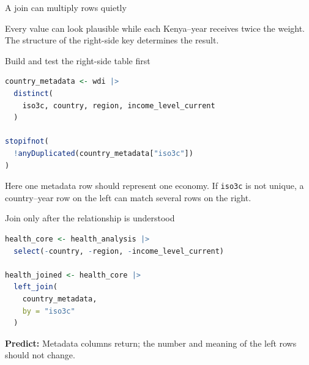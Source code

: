 \begin{frame}{A join can multiply rows quietly}
  \begin{center}
  \end{center}

  \vspace{0.65em}
  Every value can look plausible while each Kenya--year receives twice the
  weight. The structure of the right-side key determines the result.
\end{frame}

\begin{frame}[fragile]{Build and test the right-side table first}
\begin{lstlisting}[language=R]
country_metadata <- wdi |>
  distinct(
    iso3c, country, region, income_level_current
  )

stopifnot(
  !anyDuplicated(country_metadata["iso3c"])
)
\end{lstlisting}

  Here one metadata row should represent one economy. If \texttt{iso3c} is not
  unique, a country--year row on the left can match several rows on the right.
\end{frame}

\begin{frame}[fragile]{Join only after the relationship is understood}
\begin{lstlisting}[language=R]
health_core <- health_analysis |>
  select(-country, -region, -income_level_current)

health_joined <- health_core |>
  left_join(
    country_metadata,
    by = "iso3c"
  )
\end{lstlisting}

  \textbf{Predict:} Metadata columns return; the number and meaning of the left
  rows should not change.
\end{frame}

